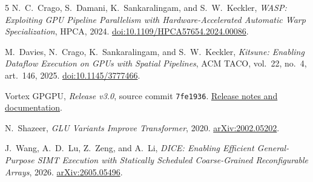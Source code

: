 \documentclass[11pt,letterpaper]{article}
\begin{document}
\begingroup
\footnotesize
\setlength{\parskip}{0pt}
\begin{thebibliography}{5}
\setlength{\itemsep}{0.15em}
N.~C.~Crago, S.~Damani, K.~Sankaralingam, and S.~W.~Keckler,
\emph{WASP: Exploiting GPU Pipeline Parallelism with Hardware-Accelerated Automatic
Warp Specialization}, HPCA, 2024.
\href{https://doi.org/10.1109/HPCA57654.2024.00086}{doi:10.1109/HPCA57654.2024.00086}.

M.~Davies, N.~Crago, K.~Sankaralingam, and S.~W.~Keckler,
\emph{Kitsune: Enabling Dataflow Execution on GPUs with Spatial Pipelines},
ACM TACO, vol.~22, no.~4, art.~146, 2025.
\href{https://doi.org/10.1145/3777466}{doi:10.1145/3777466}.

Vortex GPGPU, \emph{Release v3.0}, source commit \texttt{7fe1936}.
\href{https://github.com/vortexgpgpu/vortex/releases/tag/v3.0}{Release notes and documentation}.

N.~Shazeer, \emph{GLU Variants Improve Transformer}, 2020.
\href{https://arxiv.org/abs/2002.05202}{arXiv:2002.05202}.

J.~Wang, A.~D.~Lu, Z.~Zeng, and A.~Li,
\emph{DICE: Enabling Efficient General-Purpose SIMT Execution with Statically
Scheduled Coarse-Grained Reconfigurable Arrays}, 2026.
\href{https://arxiv.org/abs/2605.05496}{arXiv:2605.05496}.
\end{thebibliography}
\endgroup
\end{document}
